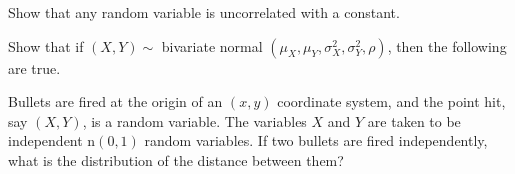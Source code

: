 \documentclass[12pt,letterpaper]{exam}
\begin{document}
\begin{questions}
	\begin{solution}
		
	\end{solution}

	\setcounter{question}{40}
	\question 
	Show that any random variable is uncorrelated with a constant.
	
	\begin{solution}
		
	\end{solution}

	\setcounter{question}{44}
	\question 
	Show that if \((X,Y)\sim\) bivariate normal
	\((\mu_X, \mu_Y , \sigma_X^2 , \sigma_Y^2 , \rho)\), then the following are true.
	
	
	\begin{solution}
		
	\end{solution}

	\setcounter{question}{51}
	\question 
	Bullets are fired at the origin of an \((x, y)\) coordinate system, and the point hit, say \((X, Y )\), is a random variable. The variables \(X\) and \(Y\) are taken to be independent n\((0, 1)\) random variables. If two bullets are fired independently, what is the distribution of the distance between them?
	
	\begin{solution}
		
	\end{solution}

\end{questions}
\end{document}

